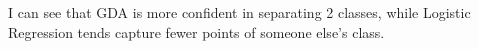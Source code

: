\begin{answer}
I can see that GDA is more confident in separating 2 classes, while Logistic Regression tends capture fewer points of someone else's class.
\end{answer}
